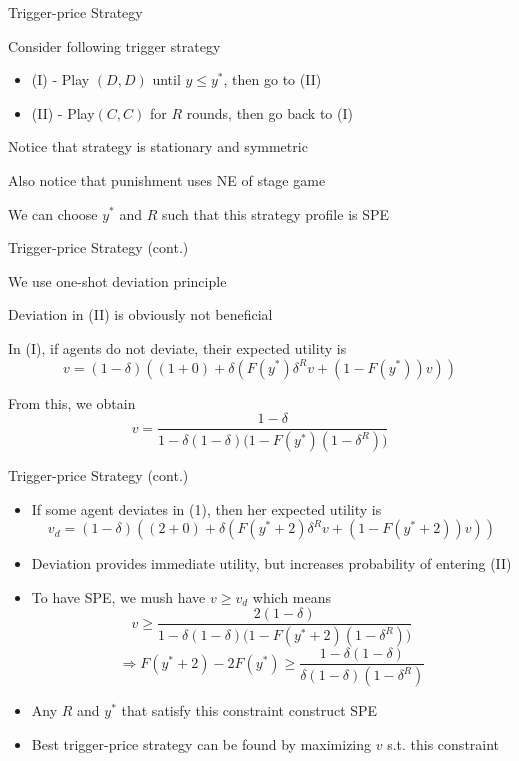 \documentclass[11pt,aspectratio=169,handout]{beamer}
\begin{document}
  
  \begin{frame} {Trigger-price Strategy}
   \begin{itemizes}[1.2em]
    \item Consider following trigger strategy
    \begin{itemize}
     \item (I) - Play $(D, D)$ until $y \le y^{*}$, then go to (II)
     \item (II) - Play$ (C, C)$ for $R$ rounds, then go back to (I)
    \end{itemize}
    \item Notice that strategy is stationary and symmetric
    \item Also notice that punishment uses \alert{NE of stage game}
    \item We can choose $y^{*}$ and $R$ such that this strategy profile is SPE
   \end{itemizes}
  \end{frame}


  \begin{frame} {Trigger-price Strategy (cont.)}
   \begin{itemizes}
    \item We use one-shot deviation principle
    \item Deviation in (II) is obviously not beneficial
    \item In (I), if agents do not deviate, their \alert{expected utility} is
    $$
    v = (1-\delta)\left((1+0)+\delta\left(F(y^*)\delta^{R} v + (1-F(y^*)) v \right)\right)
    $$
    \item From this, we obtain
    $$
    v = \frac{1-\delta}{1-\delta(1-\delta)\big(1-F(y^*)(1-\delta^{R})\big)}
    $$    
   \end{itemizes}
  \end{frame}

  \begin{frame}{Trigger-price Strategy (cont.)}
   
   \begin{itemize}
    \item If some agent deviates in (1), then her expected utility is
    $$
    v_d = (1-\delta)\left((2+0)+\delta\left(F(y^*+2)\delta^{R} v + (1-F(y^*+2)) v \right)\right)
    $$
    \item Deviation provides immediate utility, but increases probability of entering (II)
    \item To have SPE, we mush have $v \geq v_d$ which means
    $$
    v \ge \frac{2(1-\delta)}{1-\delta(1-\delta)\big(1-F(y^*+2)(1-\delta^{R})\big)}
    $$
    $$
    \Rightarrow F(y^*+2)-2F(y^*) \ge \frac{1-\delta(1-\delta)}{\delta(1-\delta)(1-\delta^{R})}
    $$
    \item  Any $R$ and $y^{*}$ that satisfy this constraint construct SPE
    \item \alert{Best trigger-price strategy} can be found by maximizing $v$ s.t. this constraint
   \end{itemize}
 
  \end{frame}  
  
\end{document}
